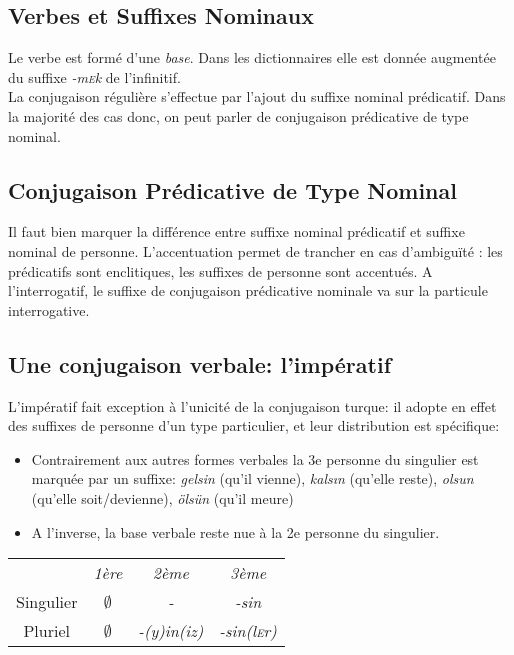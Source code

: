 \documentclass{cours}
\newcommand{\sce}{\textsc{e}}
\begin{document}
\subsection{Verbes et Suffixes Nominaux}
Le verbe est formé d'une \emph{base}. Dans les dictionnaires elle est donnée augmentée du suffixe \textsl{-m\sce k} de l'infinitif.\\
La conjugaison régulière s'effectue par l'ajout du suffixe nominal prédicatif. Dans la majorité des cas donc, on peut parler de conjugaison prédicative de type nominal.

\subsection{Conjugaison Prédicative de Type Nominal}
Il faut bien marquer la différence entre suffixe nominal prédicatif et suffixe nominal de personne. L'accentuation permet de trancher en cas d'ambiguïté : les prédicatifs sont enclitiques, les suffixes de personne sont accentués. A l'interrogatif, le suffixe de conjugaison prédicative nominale va sur la particule interrogative.

\subsection{Une conjugaison verbale: l'impératif}
L'impératif fait exception à l'unicité de la conjugaison turque: il adopte en effet des suffixes de personne d'un type particulier, et leur distribution est spécifique:
\begin{itemize}
    \item Contrairement aux autres formes verbales la 3e personne du singulier est marquée par un suffixe: \textsl{gelsin} (qu'il vienne), \textsl{kals\i n} (qu'elle reste), \textsl{olsun} (qu'elle soit/devienne), \textsl{ölsün} (qu'il meure)
    \item A l'inverse, la base verbale reste nue à la 2e personne du singulier.
\end{itemize}
\begin{center}
    \begin{tabular}{c>{\sl}c>{\sl}c>{\sl}c}
                  & 1ère        & 2ème       & 3ème          \\
        Singulier & $\emptyset$ & -          & -sin          \\
        Pluriel   & $\emptyset$ & -(y)in(iz) & -sin(l\sce r)
    \end{tabular}
\end{center}
\end{document}
